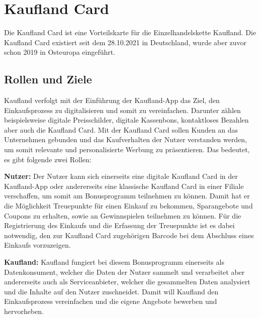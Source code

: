 \section{Kaufland Card}
Die Kaufland Card ist eine Vorteilskarte für die Einzelhandelskette Kaufland. Die Kaufland Card existiert seit dem 28.10.2021 in Deutschland, wurde aber zuvor schon 2019 in Osteuropa eingeführt.

\subsection{Rollen und Ziele}
Kaufland verfolgt mit der Einführung der Kaufland-App das Ziel, den Einkaufsprozess zu digitalisieren und somit zu vereinfachen. Darunter zählen beispielsweise digitale Preisschilder, digitale Kassenbons, kontaktloses Bezahlen aber auch die Kaufland Card. \cite{Kaufland_Ziele} Mit der Kaufland Card sollen Kunden an das Unternehmen gebunden und das Kaufverhalten der Nutzer verstanden werden, um somit relevante und personalisierte Werbung zu präsentieren. \cite{Kaufland_Datenschutz} Das bedeutet, es gibt folgende zwei Rollen: \newline

\noindent \textbf{Nutzer:} Der Nutzer kann sich einerseits eine digitale Kaufland Card in der Kaufland-App oder andererseits eine klassische Kaufland Card in einer Filiale verschaffen, um somit am Bonusprogramm teilnehmen zu können. Damit hat er die Möglichkeit Treuepunkte für einen Einkauf zu bekommen, Sparangebote und Coupons zu erhalten, sowie an Gewinnspielen teilnehmen zu können. Für die Registrierung des Einkaufs und die Erfassung der Treuepunkte ist es dabei notwendig, den zur Kaufland Card zugehörigen Barcode bei dem Abschluss eines Einkaufs vorzuzeigen. \newline

\noindent \textbf{Kaufland:} Kaufland fungiert bei diesem Bonusprogramm einerseits als Datenkonsument, welcher die Daten der Nutzer sammelt und verarbeitet aber andererseits auch als Serviceanbieter, welcher die gesammelten Daten analysiert und die Inhalte auf den Nutzer zuschneidet. Damit will Kaufland den Einkaufsprozess vereinfachen und die eigene Angebote bewerben und hervorheben.



